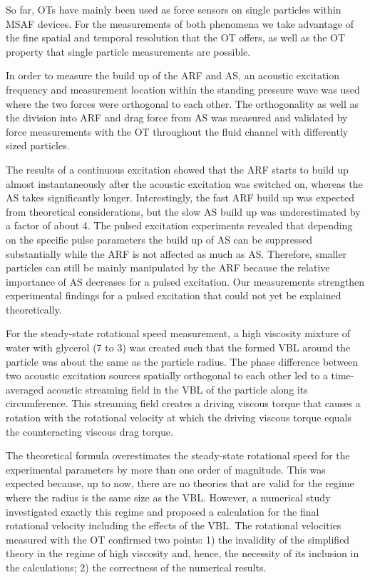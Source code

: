 So far, OTs have mainly been used as force sensors on single particles within 
MSAF devices. For the measurements of both phenomena we take advantage of the 
fine spatial and temporal resolution that the OT offers, as well as the OT 
property that single particle measurements are possible.

In order to measure the build up of the ARF and AS, an acoustic excitation 
frequency and measurement location within the standing pressure wave was used 
where the two forces were orthogonal to each other. The orthogonality as well 
as the division into ARF and drag force from AS was measured and validated by 
force measurements with the OT throughout the fluid channel with differently 
sized particles.

The results of a continuous excitation showed that the ARF starts to build up 
almost instantaneously after the acoustic excitation was switched on, whereas 
the AS takes significantly longer. Interestingly, the fast ARF build up was 
expected from theoretical considerations, but the slow AS build up was 
underestimated by a factor of about 4. The pulsed excitation experiments 
revealed that depending on the specific pulse parameters the build up of AS can 
be suppressed substantially while the ARF is not affected as much as AS. 
Therefore, smaller particles can still be mainly manipulated by the ARF because 
the relative importance of AS decreases for a pulsed excitation. Our 
measurements strengthen experimental findings for a pulsed excitation that 
could not yet be explained theoretically.


For the steady-state rotational speed measurement, a high viscosity mixture of 
water with glycerol (7 to 3) was created such that the formed VBL around the 
particle was about the same as the particle radius. The phase difference 
between two acoustic excitation sources spatially orthogonal to each other led 
to a time-averaged acoustic streaming field in the VBL of the particle along 
its circumference. This streaming field creates a driving viscous torque that 
causes a rotation with the rotational velocity at which the driving viscous 
torque equals the counteracting viscous drag torque.

The theoretical formula overestimates the steady-state rotational speed for the 
experimental parameters by more than one order of magnitude. This was expected 
because, up to now, there are no theories that are valid for the regime where 
the radius is the same size as the VBL. However, a numerical study investigated 
exactly this regime and proposed a calculation for the final rotational 
velocity including the effects of the VBL. The rotational velocities measured 
with the OT confirmed two points: 1) the invalidity of the simplified theory in 
the regime of high viscosity and, hence, the necessity of its inclusion in the 
calculations; 2) the correctness of the numerical results.

